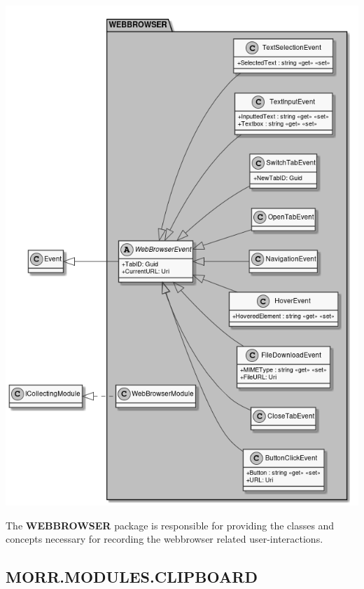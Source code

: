 \begin{center}
    \includegraphics[width=1.0\textwidth]{resources/Packages/MODULES_WEBBROWSER.png}
\end{center}

The \textbf{WEBBROWSER} package is responsible for providing the classes and concepts necessary for recording the webbrowser related user-interactions.

\begin{packclass}
\end{packclass}

\newpage
\subsection*{MORR.MODULES.CLIPBOARD}

